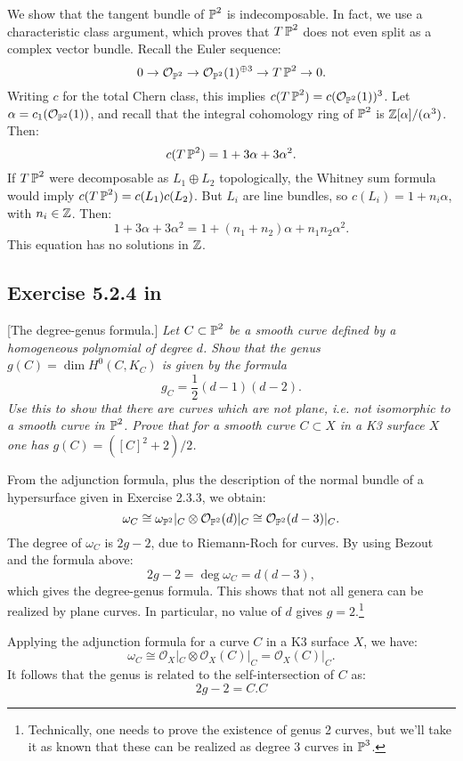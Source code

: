\documentclass{article}
\begin{document}
We show that the tangent bundle of $\operatorname{\mathbb{P}}^2$ is indecomposable. In fact, we use a characteristic class argument, which
proves that $T\operatorname{\mathbb{P}}^2$ does not even split as a complex vector bundle. Recall the Euler sequence:
\[	0 \to \mathcal{O}_{\operatorname{\mathbb{P}}^2} \to \mathcal{O}_{\operatorname{\mathbb{P}}^2}(1)^{\oplus 3} \to T\operatorname{\mathbb{P}}^2 \to 0.	\]
Writing $c$ for the total Chern class, this implies $c(T\operatorname{\mathbb{P}}^2) = c(\mathcal{O}_{\operatorname{\mathbb{P}}^2}(1))^3$. Let
$\alpha = c_1(\mathcal{O}_{\operatorname{\mathbb{P}}^2}(1))$, and recall that the integral cohomology ring of $\operatorname{\mathbb{P}}^2$ is $\mathbb{Z}[\alpha]/(\alpha^3)$.
Then:
\[	c(T\operatorname{\mathbb{P}}^2) = 1 + 3\alpha + 3\alpha^2.	\]
If $T\operatorname{\mathbb{P}}^2$ were decomposable as $L_1 \oplus L_2$ topologically, the Whitney sum formula would imply $c(T\operatorname{\mathbb{P}}^2) = c(L_1) c(L_2)$.
But $L_i$ are line bundles, so $c(L_i) = 1 + n_i \alpha$, with $n_i \in \mathbb{Z}$. Then:
\[	1 + 3 \alpha + 3 \alpha^2 = 1 + (n_1 + n_2) \alpha + n_1n_2 \alpha^2.	\]
This equation has no solutions in $\mathbb{Z}$.



\subsection*{Exercise 5.2.4 in \cite{Huy}}[The degree-genus formula.]
\emph{Let $C \subset \operatorname{\mathbb{P}}^2$ be a smooth curve defined by
a homogeneous polynomial of degree $d$. Show that the genus $g(C) = \dim H^0(C, K_C)$
is given by the formula}
\[	g_C = \frac{1}{2}(d-1)(d-2).	\]
\emph{Use this to show that there are curves which are not plane, i.e. not isomorphic
to a smooth curve in $\operatorname{\mathbb{P}}^2$. Prove that for a smooth curve $C \subset X$ in a K3 surface $X$
one has $g(C) = ([C]^2 + 2)/2$.}
\vspace{3mm}

From the adjunction formula, plus the description of the normal bundle of a hypersurface given in Exercise 2.3.3,
we obtain:
\[	\omega_C \cong \omega_{\operatorname{\mathbb{P}}^2}|_{C} \otimes \mathcal{O}_{\operatorname{\mathbb{P}}^2}(d)|_{C} \cong \mathcal{O}_{\operatorname{\mathbb{P}}^2}(d-3)|_C.	\]
The degree of $\omega_C$ is $2g-2$, due to Riemann-Roch for curves. By using Bezout and the formula above:
\[	2g-2 = \deg \omega_C = d(d-3),	\]
which gives the degree-genus formula. This shows that not all genera can be realized by plane curves. In particular, no
value of $d$ gives $g=2$.\footnote{Technically, one needs to prove the existence of genus 2 curves, but we'll take it
as known that these can be realized as degree 3 curves in $\operatorname{\mathbb{P}}^3$.}

Applying the adjunction formula for a curve $C$ in a K3 surface $X$, we have:
\[	\omega_C \cong \mathcal{O}_X|_C \otimes \mathcal{O}_X(C)|_C = \mathcal{O}_X(C)|_C.	\]
It follows that the genus is related to the self-intersection of $C$ as:
\[	2g-2 = C.C	\]
\end{document}
